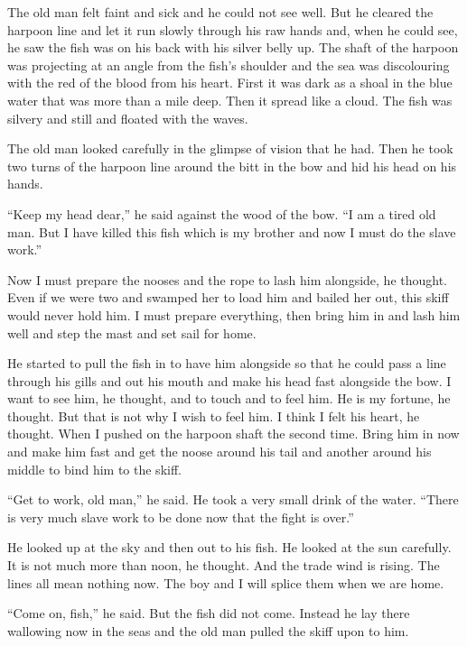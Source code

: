 The old man felt faint and sick and he could not see well. But he cleared
the harpoon line and let it run slowly through his raw hands and, when he
could see, he saw the fish was on his back with his silver belly up. The
shaft of the harpoon was projecting at an angle from the fish's shoulder and
the sea was \gls{discolouring} with the red of the blood from his heart.
First it was dark as a \gls{shoal} in the blue water that was more than a
mile deep. Then it spread like a cloud. The fish was silvery and still and
floated with the \glspl{wave}.

The old man looked carefully in the \gls{glimpse} of \gls{vision} that he
had. Then he took two turns of the harpoon line around the bitt in the bow
and \gls{hid} his head on his hands.

``Keep my head dear,'' he said against the wood of the bow. ``I am a tired
old man. But I have killed this fish which is my brother and now I must do
the slave work.''

Now I must prepare the \glspl{noose} and the rope to lash him alongside, he
thought. Even if we were two and \gls{swamped} her to load him and \gls{bailed}
her out, this skiff would never hold him. I must prepare everything, then
bring him in and lash him well and step the mast and set sail for home.

He started to pull the fish in to have him alongside so that he could pass a
line through his gills and out his mouth and make his head fast alongside
the bow. I want to see him, he thought, and to touch and to feel him. He is
my \gls{fortune}, he thought. But that is not why I wish to feel him. I think I
felt his heart, he thought. When I pushed on the harpoon shaft the second
time. Bring him in now and make him fast and get the noose around his tail
and another around his middle to bind him to the skiff.

``Get to work, old man,'' he said. He took a very small drink of the water.
``There is very much slave work to be done now that the fight is over.''

He looked up at the sky and then out to his fish. He looked at the sun
carefully. It is not much more than noon, he thought. And the trade wind is
rising. The lines all mean nothing now. The boy and I will \gls{splice} them
when we are home.

``Come on, fish,'' he said. But the fish did not come. Instead he lay there
\gls{wallowing} now in the seas and the old man pulled the skiff \gls{upon} to
him.

